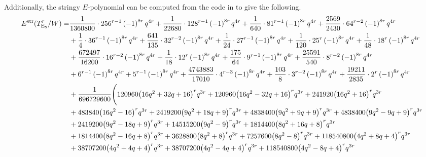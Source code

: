 \documentclass[11pt,english]{amsart}
\numberwithin{equation}{section}
\numberwithin{figure}{section}
\theoremstyle{plain}
\theoremstyle{plain}
\theoremstyle{definition}
\theoremstyle{remark}
\newcommand{\E}{\operatorname{E}}
\newcommand{\str}{\textup{str}}
\begin{document}
Additionally, the stringy $E$-polynomial can be computed from the code in \cite{code_repository} to give the following.
{\tiny
\begin{align*}
E^{\str}(T_{\E_8}^r/W) = & \frac{1}{1360800} \cdot 256^{r - 1} \left(-1\right)^{8  r} q^{4  r} + \frac{1}{22680} \cdot 128^{r - 1} \left(-1\right)^{8  r} q^{4  r} + \frac{1}{640} \cdot 81^{r - 1} \left(-1\right)^{8  r} q^{4  r} + \frac{2569}{2430} \cdot 64^{r - 2} \left(-1\right)^{8  r} q^{4  r} \\
& + \frac{1}{4} \cdot 36^{r - 1} \left(-1\right)^{8  r} q^{4  r} + \frac{641}{135} \cdot 32^{r - 2} \left(-1\right)^{8  r} q^{4  r} + \frac{1}{24} \cdot 27^{r - 1} \left(-1\right)^{8  r} q^{4  r} + \frac{1}{120} \cdot 25^{r} \left(-1\right)^{8  r} q^{4  r} + \frac{1}{48} \cdot 18^{r} \left(-1\right)^{8  r} q^{4  r} \\
& + \frac{672497}{16200} \cdot 16^{r - 2} \left(-1\right)^{8  r} q^{4  r} + \frac{1}{18} \cdot 12^{r} \left(-1\right)^{8  r} q^{4  r} + \frac{175}{64} \cdot 9^{r - 1} \left(-1\right)^{8  r} q^{4  r} + \frac{25591}{540} \cdot 8^{r - 2} \left(-1\right)^{8  r} q^{4  r} \\
& + 6^{r - 1} \left(-1\right)^{8  r} q^{4  r} + 5^{r - 1} \left(-1\right)^{8  r} q^{4  r} + \frac{4743883}{17010} \cdot 4^{r - 3} \left(-1\right)^{8  r} q^{4  r} + \frac{103}{8} \cdot 3^{r - 2} \left(-1\right)^{8  r} q^{4  r} + \frac{19211}{2835} \cdot 2^{r} \left(-1\right)^{8  r} q^{4  r} \\
& + \frac{1}{696729600}  \Biggl(120960  {\left(16  q^{2} + 32  q + 16\right)}^{r} q^{3  r} + 120960  {\left(16  q^{2} - 32  q + 16\right)}^{r} q^{3  r} + 241920  {\left(16  q^{2} + 16\right)}^{r} q^{3  r} \\
& + 483840  {\left(16  q^{2} - 16\right)}^{r} q^{3  r} + 2419200  {\left(9  q^{2} + 18  q + 9\right)}^{r} q^{3  r} + 4838400  {\left(9  q^{2} + 9  q + 9\right)}^{r} q^{3  r} + 4838400  {\left(9  q^{2} - 9  q + 9\right)}^{r} q^{3  r} \\
& + 2419200  {\left(9  q^{2} - 18  q + 9\right)}^{r} q^{3  r} + 14515200  {\left(9  q^{2} - 9\right)}^{r} q^{3  r} + 1814400  {\left(8  q^{2} + 16  q + 8\right)}^{r} q^{3  r} \\
& + 1814400  {\left(8  q^{2} - 16  q + 8\right)}^{r} q^{3  r} + 3628800  {\left(8  q^{2} + 8\right)}^{r} q^{3  r} + 7257600  {\left(8  q^{2} - 8\right)}^{r} q^{3  r} + 118540800  {\left(4  q^{2} + 8  q + 4\right)}^{r} q^{3  r} \\
& + 38707200  {\left(4  q^{2} + 4  q + 4\right)}^{r} q^{3  r} + 38707200  {\left(4  q^{2} - 4  q + 4\right)}^{r} q^{3  r} + 118540800  {\left(4  q^{2} - 8  q + 4\right)}^{r} q^{3  r} \\

\end{align*}}
\end{document}
